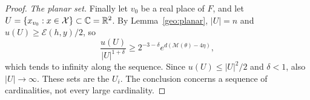 \begin{proof}
\emph{The planar set.} Finally let $v_0$ be a real place of $F$, and let
$U=\{x_{v_0}:x\in\mathcal X\}\subset\mathbb C=\mathbb R^2$. By
Lemma~\ref{geo:planar}, $|U|=n$ and $u(U)\ge\mathcal E(h,y)/2$, so
\[
 \frac{u(U)}{|U|^{1+\delta}}
 \ge2^{-3-\delta}e^{d(\mathcal M(\theta)-4\eta)},
\]
which tends to infinity along the sequence. Since $u(U)\le|U|^2/2$ and
$\delta<1$, also $|U|\to\infty$. These sets are the $U_i$. The
conclusion concerns a sequence of cardinalities, not every large
cardinality.
\end{proof}
